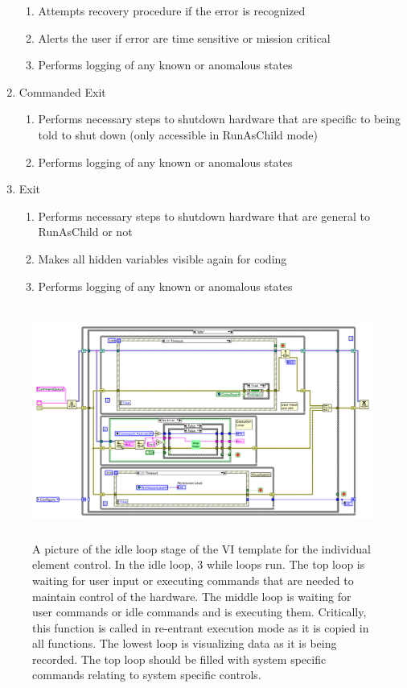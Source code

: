 \begin{enumerate}
\begin{enumerate}
		\item{Attempts recovery procedure if the error is recognized}
		\item{Alerts the user if error are time sensitive or mission critical}
		\item{Performs logging of any known or anomalous states}
	\end{enumerate}
	\item{Commanded Exit}
	\begin{enumerate}
		\item{Performs necessary steps to shutdown hardware that are specific to being told to shut down (only accessible in RunAsChild mode)}
		\item{Performs logging of any known or anomalous states}
	\end{enumerate}
	\item{Exit}
	\begin{enumerate}
		\item{Performs necessary steps to shutdown hardware that are general to RunAsChild or not}
		\item{Makes all hidden variables visible again for coding}
		\item{Performs logging of any known or anomalous states}
	\end{enumerate}
\end{enumerate}


\begin{figure}[!h]\centering
\includegraphics[height=3in]{Figures/MainVITemplateBackPanel.pdf}
\caption{A picture of the idle loop stage of the VI template for the individual element control. In the idle loop, 3 while loops run. The top loop is waiting for user input or executing commands that are needed to maintain control of the hardware. The middle loop is waiting for user commands or idle commands and is executing them. Critically, this function is called in re-entrant execution mode as it is copied in all functions. The lowest loop is visualizing data as it is being recorded. The top loop should be filled with system specific commands relating to system specific controls.}\label{Fig:VITemplateBP}
\end{figure}


